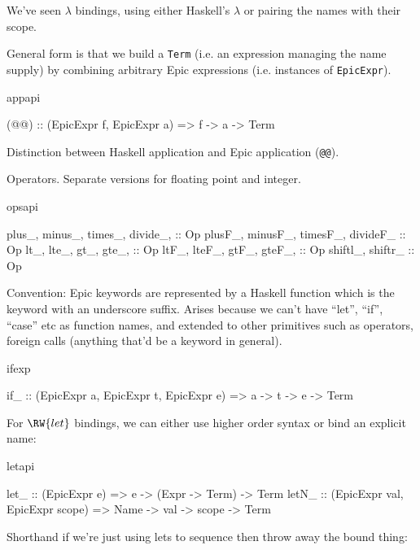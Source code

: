 We've seen $\lambda$ bindings, using either Haskell's $\lambda$ or
pairing the names with their scope.

General form is that we build a \texttt{Term} (i.e. an expression
managing the name supply) by combining arbitrary Epic expressions
(i.e. instances of \texttt{EpicExpr}).

\begin{SaveVerbatim}{appapi}

(@@) :: (EpicExpr f, EpicExpr a) => f -> a -> Term

\end{SaveVerbatim}

Distinction between Haskell application and Epic
application (\texttt{@@}).

Operators. Separate versions for floating point and integer.

\begin{SaveVerbatim}{opsapi}

plus_, minus_, times_, divide_,    :: Op
plusF_, minusF_, timesF_, divideF_ :: Op
lt_, lte_, gt_, gte_,              :: Op
ltF_, lteF_, gtF_, gteF_,          :: Op
shiftl_, shiftr_                  :: Op

\end{SaveVerbatim}

Convention: Epic keywords are represented by a Haskell function which
is the keyword with an underscore suffix. Arises because we can't have
``let'', ``if'', ``case'' etc as function names, and extended to other
primitives such as operators, foreign calls (anything that'd be a
keyword in general).

\begin{SaveVerbatim}{ifexp}

if_ :: (EpicExpr a, EpicExpr t, EpicExpr e) =>
       a -> t -> e -> Term

\end{SaveVerbatim}

For $\RW{let}$ bindings, we can either use higher order syntax or bind
an explicit name:

\begin{SaveVerbatim}{letapi}

let_  :: (EpicExpr e) => 
         e -> (Expr -> Term) -> Term
letN_ :: (EpicExpr val, EpicExpr scope) =>
         Name -> val -> scope -> Term

\end{SaveVerbatim}

Shorthand if we're just using lets to sequence then throw away the
bound thing:


